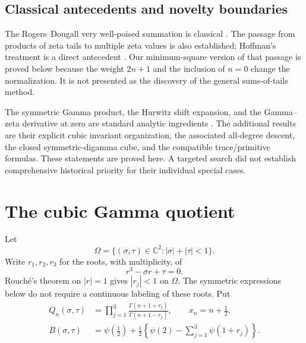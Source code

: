 \documentclass[11pt]{article}
\numberwithin{equation}{section}
\theoremstyle{definition}\newtheorem{definition}[theorem]{Definition}
\theoremstyle{remark}\newtheorem{remark}[theorem]{Remark}
\newcommand{\CC}{\mathbb C}
\newcommand{\Om}{\Omega}
\begin{document}
\subsection{Classical antecedents and novelty boundaries}
The Rogers--Dougall very well-poised summation is classical
\cite{ct:dlmf16}. The passage from products of zeta tails to multiple zeta
values is also established; Hoffman's treatment is a direct antecedent
\cite{ct:hoffman}. Our minimum-square version of that passage is proved
below because the weight $2n+1$ and the inclusion of $n=0$ change the
normalization. It is not presented as the discovery of the general
sums-of-tails method.

The symmetric Gamma product, the Hurwitz shift expansion, and the
Gamma--zeta derivative at zero are standard analytic ingredients
\cite{ct:dlmf5,ct:dlmf25}. The additional results are their explicit cubic
invariant organization, the associated all-degree descent, the closed
symmetric-digamma cube, and the compatible trace/primitive formulas.
These statements are proved here. A targeted search did not establish
comprehensive historical priority for their individual special cases.

\section{The cubic Gamma quotient}
\label{ct:sec:gamma}
Let
\begin{equation}\label{ct:eq:domain}
 \Om=\{(\sigma,\tau)\in\CC^2:|\sigma|+|\tau|<1\}.
\end{equation}
Write $r_1,r_2,r_3$ for the roots, with multiplicity, of
\begin{equation}\label{ct:eq:cubic-poly}
 r^3-\sigma r+\tau=0.
\end{equation}
Rouch\'e's theorem on $|r|=1$ gives $|r_j|<1$ on $\Om$.
The symmetric expressions below do not require a continuous labeling of
these roots. Put
\begin{align}
 Q_n(\sigma,\tau)
   &=\prod_{j=1}^3\frac{\Gamma(n+1+r_j)}{\Gamma(n+1-r_j)},
       \qquad x_n=n+\tfrac12,\label{ct:eq:Q}\\
 B(\sigma,\tau)
   &=\psi(\tfrac12)+\frac12\left\{\psi(2)-\sum_{j=1}^3\psi(1+r_j)\right\}.
       \label{ct:eq:B}
\end{align}
\end{document}
